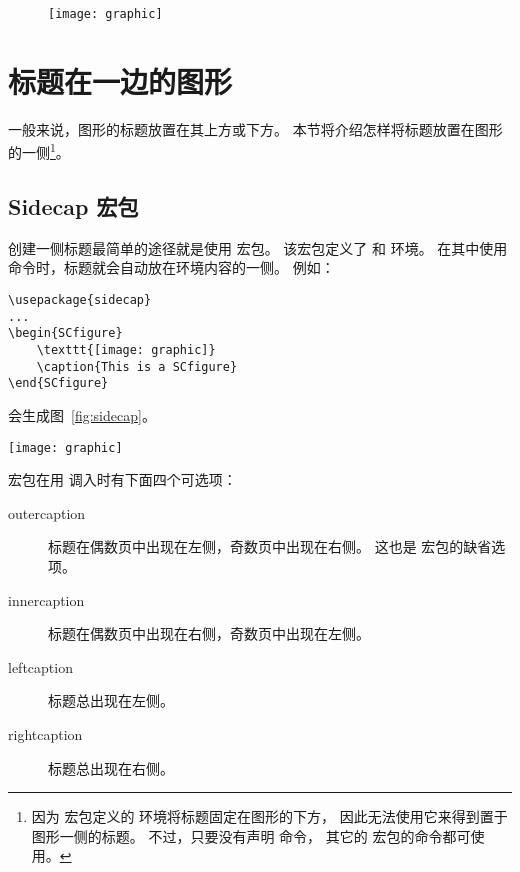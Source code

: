 \begin{figure}
	\centering
	\begin{minipage}[c]{1in}
		\hfill\texttt{[image: graphic]}
	\end{minipage}%
	\hspace{0.2in}%
	\begin{minipage}[c]{0.5in}
		\captionsetup{width=2in}
		\label{fig:rotcaption}
	\end{minipage}
\end{figure}


\section{标题在一边的图形}\label{sec:sidecaption}

一般来说，图形的标题放置在其上方或下方。
本节将介绍怎样将标题放置在图形的一侧\footnote{
	因为  宏包定义的  环境将标题固定在图形的下方，
	因此无法使用它来得到置于图形一侧的标题。
	不过，只要没有声明  命令，
	其它的  宏包的命令都可使用。}。


\subsection{Sidecap 宏包}\label{ssec:sidecap}

创建一侧标题最简单的途径就是使用  宏包。
该宏包定义了  和  环境。
在其中使用  命令时，标题就会自动放在环境内容的一侧。
例如：
\begin{lstlisting}
\usepackage{sidecap}
...
\begin{SCfigure}
	\texttt{[image: graphic]}
	\caption{This is a SCfigure}
\end{SCfigure}
\end{lstlisting}
会生成图~\ref{fig:sidecap}。

\begin{SCfigure} 
	\texttt{[image: graphic]}
	\caption{This is a SCfigure}
	\label{fig:sidecap}
\end{SCfigure}

 宏包在用  调入时有下面四个可选项：
\begin{description}
	\item [outercaption] 标题在偶数页中出现在左侧，奇数页中出现在右侧。
	这也是  宏包的缺省选项。
	\item [innercaption] 标题在偶数页中出现在右侧，奇数页中出现在左侧。
	\item [leftcaption]  标题总出现在左侧。
	\item [rightcaption] 标题总出现在右侧。
\end{description}

